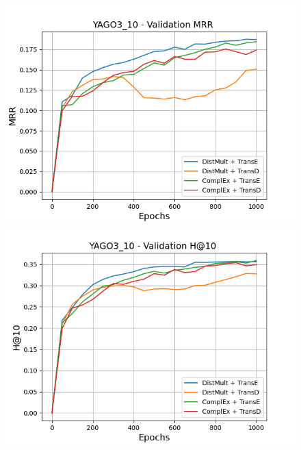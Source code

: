 \begin{figure}[H]
    \centering
    \begin{minipage}{.45\textwidth}
      \centering
      \includegraphics[width=0.9\linewidth]{figures/results/gan_train/not_pretrained/random/yago3_10/1k_epochs/random_yago3_10_mrrs.png}
    \end{minipage}%
    \begin{minipage}{.45\textwidth}
      \centering
      \includegraphics[width=0.9\linewidth]{figures/results/gan_train/not_pretrained/random/yago3_10/1k_epochs/random_yago3_10_hit10.png}
    \end{minipage}
    

\end{figure}
